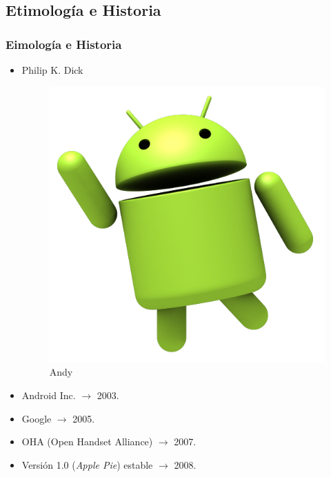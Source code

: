 \subsection{Etimología e Historia}
\begin{frame}
  \frametitle{Eimología e Historia}
  \begin{itemize}
    \item Philip K. Dick
    \begin{figure}
	\includegraphics[scale=0.1]{images/andy.png}
	\caption{Andy}
    \end{figure}
    
    \item Android Inc. $\rightarrow$ 2003.
    
    \item Google $\rightarrow$ 2005.
    
    \item OHA (Open Handset Alliance) $\rightarrow$ 2007.
    
    \item Versión 1.0 (\emph{Apple Pie}) estable $\rightarrow$ 2008.
  \end{itemize}
\end{frame}

